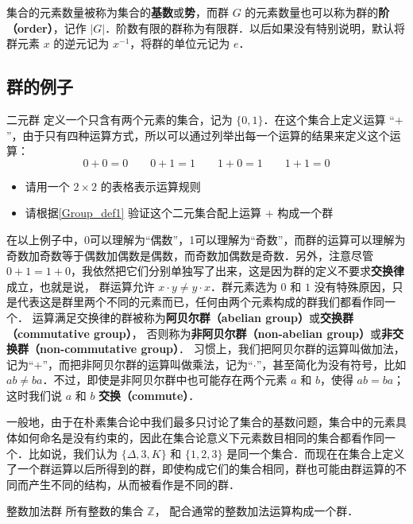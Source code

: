 集合的元素数量被称为集合的\textbf{基数}或\textbf{势}，而群 $G$ 的元素数量也可以称为群的\textbf{阶（order）}，记作 $|G|$．阶数有限的群称为有限群．以后如果没有特别说明，默认将群元素 $x$ 的逆元记为 $x^{-1}$，将群的单位元记为 $e$．

\subsection{群的例子}

\begin{exercise}{二元群}\label{Group_exe1}
定义一个只含有两个元素的集合，记为 $\{0, 1\}$．在这个集合上定义运算 “$+$”，由于只有四种运算方式，所以可以通过列举出每一个运算的结果来定义这个运算：
\begin{equation}\label{Group_eq1}
0+0=0 \qquad 0+1=1 \qquad 1+0=1 \qquad 1+1=0
\end{equation}
\begin{itemize}
\item 请用一个 $2\times2$ 的表格表示运算规则
\item 请根据\autoref{Group_def1} 验证这个二元集合配上运算 $+$ 构成一个群
\end{itemize}
\end{exercise}

在以上例子中，0可以理解为“偶数”，1可以理解为“奇数”，而群的运算可以理解为奇数加奇数等于偶数加偶数是偶数，而奇数加偶数是奇数．另外，注意尽管 $0+1=1+0$，我依然把它们分别单独写了出来，这是因为群的定义不要求\textbf{交换律}成立，也就是说， 群运算允许 $x\cdot y\neq y\cdot x$．群元素选为 $0$ 和 $1$ 没有特殊原因，只是代表这是群里两个不同的元素而已，任何由两个元素构成的群我们都看作同一个． 运算满足交换律的群被称为\textbf{阿贝尔群（abelian group）}或\textbf{交换群（commutative group）}， 否则称为\textbf{非阿贝尔群（non-abelian group）}或\textbf{非交换群（non-commutative group）}． 习惯上，我们把阿贝尔群的运算叫做加法，记为“$+$”，而把非阿贝尔群的运算叫做乘法，记为“$\cdot$”，甚至简化为没有符号，比如 $ab\not= ba$．不过，即使是非阿贝尔群中也可能存在两个元素 $a$ 和 $b$，使得 $ab=ba$；这时我们说 $a$ 和 $b$ \textbf{交换（commute）}．

一般地，由于在朴素集合论中我们最多只讨论了集合的基数问题，集合中的元素具体如何命名是没有约束的，因此在集合论意义下元素数目相同的集合都看作同一个．比如说，我们认为 $\{\Delta,3, K\}$ 和 $\{1,2,3\}
$ 是同一个集合．而现在在集合上定义了一个群运算以后所得到的群，即使构成它们的集合相同，群也可能由群运算的不同而产生不同的结构，从而被看作是不同的群．

\begin{example}{整数加法群}\label{Group_ex1}
所有整数的集合 $\mathbb Z$， 配合通常的整数加法运算构成一个群．
\end{example}

